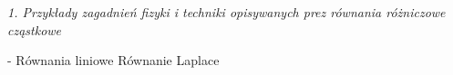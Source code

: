 \textit{1. Przykłady zagadnień fizyki i techniki opisywanych prez równania różniczowe cząstkowe}


- Równania liniowe
Równanie Laplace

